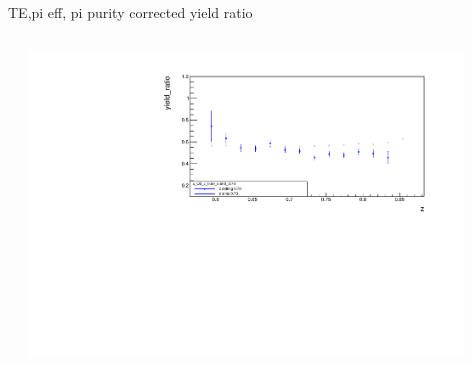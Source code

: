 \begin{frame}{TE,pi eff, pi purity corrected yield ratio}
\begin{columns}
\begin{column}[T]{0.5\textwidth}
\end{column}
\begin{column}[T]{0.5\textwidth}
\includegraphics[width = 0.9\textwidth]{results/yield/statistics_corr/x_Q2_z_50_5500_70_ratio.pdf}
\end{column}
\end{columns}
\end{frame}

